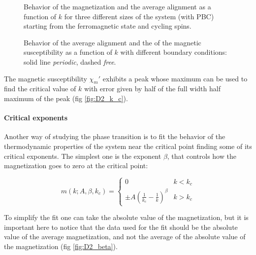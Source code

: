\documentclass[a4paper, 11pt]{article}
\begin{document}
    \begin{figure}[H]
      \centering
      \caption{Behavior of the magnetization and the average alignment as a function of $k$ for three different sizes of the system (with PBC) starting from the ferromagnetic state and cycling spins.}
      \label{fig:D2_size_dependent}
    \end{figure}

    \begin{figure}[H]
      \centering
      \caption{Behavior of the average alignment and the of the magnetic susceptibility as a function of $k$ with different boundary conditions: solid line \emph{periodic}, dashed \emph{free}.}
      \label{fig:D2_achi}
    \end{figure}

    The magnetic susceptibility $\chi_m'$ exhibits a peak whose maximum can be used to find the critical value of $k$ with error given by half of the full width half maximum of the peak (fig \ref{fig:D2_k_c}).

    \paragraph{Critical exponents}
    Another way of studying the phase transition is to fit the behavior of the thermodynamic properties of the system near the critical point finding some of its critical exponents.
    The simplest one is the exponent $\beta$, that controls how the magnetization goes to zero at the critical point:

    \begin{equation}
      m(k;A,\beta,k_c) = \begin{cases}
        0 & k < k_c \\
        \pm A \left(\frac{1}{k_c} - \frac{1}{k} \right)^\beta & k > k_c
      \end{cases}
    \end{equation}

    To simplify the fit one can take the absolute value of the magnetization, but it is important here to notice that the data used for the fit should be the absolute value of the average magnetization, and not the average of the absolute value of the magnetization (fig \ref{fig:D2_beta}).
\end{document}
